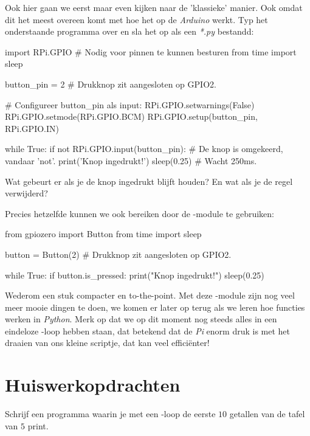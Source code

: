 Ook hier gaan we eerst maar even kijken naar de 'klassieke' manier. Ook omdat dit het meest overeen komt met hoe het op de \textit{Arduino} werkt. Typ het onderstaande programma over en sla het op als een \textit{*.py} bestandd:
\begin{python}
import RPi.GPIO  # Nodig voor pinnen te kunnen besturen
from time import sleep

button_pin = 2  # Drukknop zit aangesloten op GPIO2.

# Configureer button_pin als input:
RPi.GPIO.setwarnings(False)
RPi.GPIO.setmode(RPi.GPIO.BCM)
RPi.GPIO.setup(button_pin, RPi.GPIO.IN)

while True:
    if not RPi.GPIO.input(button_pin):  # De knop is omgekeerd, vandaar 'not'.
        print('Knop ingedrukt!')
        sleep(0.25)                     # Wacht 250ms.
\end{python}


\begin{exercise}
Wat gebeurt er als je de knop ingedrukt blijft houden? En wat als je de  regel verwijderd?
\end{exercise}

\newpage

Precies hetzelfde kunnen we ook bereiken door de -module te gebruiken:
\begin{python}
from gpiozero import Button
from time import sleep 

button = Button(2)  # Drukknop zit aangesloten op GPIO2.

while True: 
    if button.is_pressed: 
        print("Knop ingedrukt!") 
        sleep(0.25)
\end{python}

Wederom een stuk compacter en to-the-point. Met deze -module zijn nog veel meer mooie dingen te doen, we komen er later op terug als we leren hoe functies werken in \textit{Python}. Merk op dat we op dit moment nog steeds alles in een eindeloze -loop hebben staan, dat betekend dat de \textit{Pi} enorm druk is met het draaien van ons kleine scriptje, dat kan veel efficiënter!

\newpage

\section{Huiswerkopdrachten}
\begin{exercise}
Schrijf een programma waarin je met een -loop de eerste $10$ getallen van de tafel van $5$ print.
\end{exercise}

